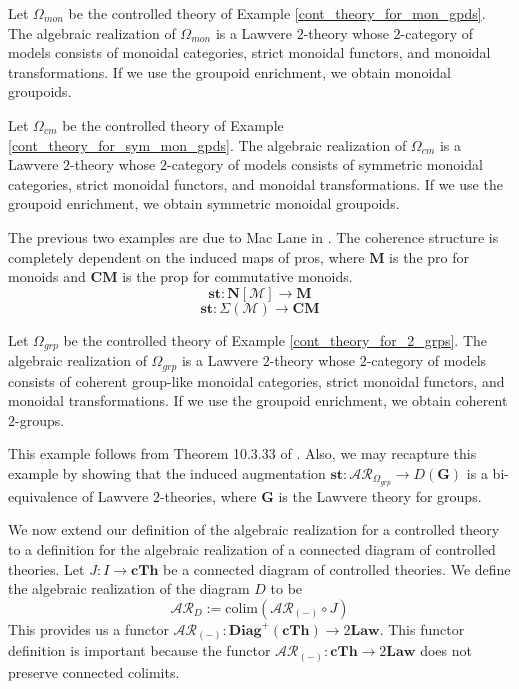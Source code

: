 \documentclass{tac}
\begin{document}
\begin{example}
Let $\Omega_{mon}$ be the controlled theory of Example \ref{cont_theory_for_mon_gpds}. The algebraic realization of $\Omega_{mon}$ is a Lawvere $2$-theory whose $2$-category of models consists of monoidal categories, strict monoidal functors, and monoidal transformations. If we use the groupoid enrichment, we obtain monoidal groupoids.
\end{example}

\begin{example}
Let $\Omega_{cm}$ be the controlled theory of Example \ref{cont_theory_for_sym_mon_gpds}. The algebraic realization of $\Omega_{cm}$ is a Lawvere $2$-theory whose $2$-category of models consists of symmetric monoidal categories, strict monoidal functors, and monoidal transformations. If we use the groupoid enrichment, we obtain symmetric monoidal groupoids.
\end{example}

The previous two examples are due to Mac Lane in \cite{MacLane1963}. The coherence structure is completely dependent on the induced maps of pros, where $\mathbf{M}$ is the pro for monoids and $\mathbf{CM}$ is the prop for commutative monoids. 
\[
\mathbf{st}:\mathbf{N}[\mathcal{M}]\to \mathbf{M}
\]
\[
\mathbf{st}:\Sigma(\mathcal{M})\to\mathbf{CM}
\]

\begin{example}
Let $\Omega_{grp}$ be the controlled theory of Example \ref{cont_theory_for_2_grps}. The algebraic realization of $\Omega_{grp}$ is a Lawvere $2$-theory whose $2$-category of models consists of coherent group-like monoidal categories, strict monoidal functors, and monoidal transformations. If we use the groupoid enrichment, we obtain coherent $2$-groups.
\end{example}

This example follows from Theorem 10.3.33 of \cite{Parab2025}.  Also, we may recapture this example by showing that the induced augmentation $\mathbf{st}:\mathcal{AR}_{\Omega_{grp}}\to D(\mathbf{G})$ is a bi-equivalence of Lawvere $2$-theories, where $\mathbf{G}$ is the Lawvere theory for groups.

We now extend our definition of the algebraic realization for a controlled theory to a definition for the algebraic realization of a connected diagram of controlled theories. Let $J:I\to \mathbf{cTh}$ be a connected diagram of controlled theories. We define the algebraic realization of the diagram $D$ to be 
\[
\mathcal{AR}_D:=\text{colim}(\mathcal{AR}_{(-)}\circ J)
\]
This provides us a functor $\mathcal{AR}_{(-)}:\mathbf{Diag}^+(\mathbf{cTh})\to 2\mathbf{Law}$. This functor definition is important because the functor 
$\mathcal{AR}_{(-)}:\mathbf{cTh}\to 2\mathbf{Law}$
does not preserve connected colimits.
\end{document}
